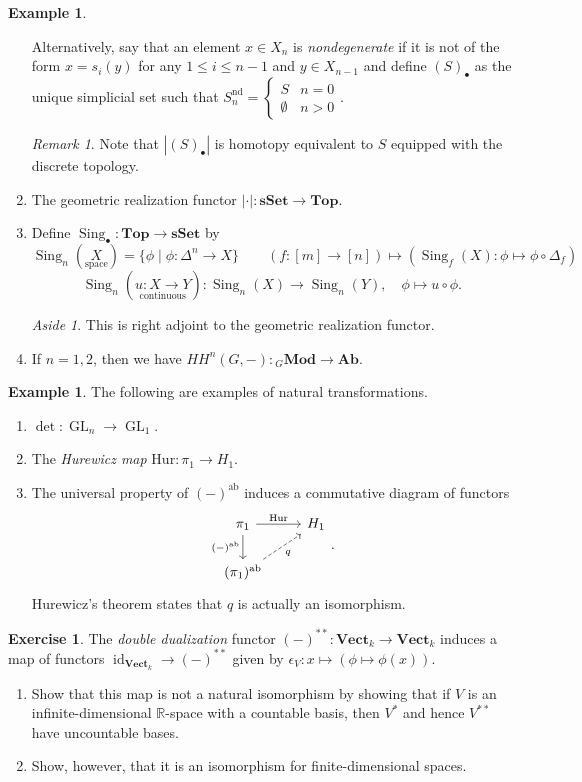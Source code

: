 \documentclass[10pt,letterpaper,cm]{nupset}
\theoremstyle{definition}
\newtheorem{exmp}[definition]{Example}
\theoremstyle{theorem}
\newtheorem{exercise}[definition]{Exercise}
\theoremstyle{remark}
\newtheorem{remark}[definition]{Remark}
\newtheorem*{aside}{Aside}
\newcommand{\R}{\mathbb R}
\newcommand{\1}{\mathbf{1}}
\newcommand{\0}{\vec 0}
\DeclareMathOperator*{\GL}{GL}
\DeclareMathOperator{\id}{id}
\DeclareMathOperator{\ab}{ab}
\DeclareMathOperator{\Sing}{Sing}
\begin{document}
\begin{exmp}
\begin{enumerate}
Alternatively, say that an element  $x\in X_n$ is \textit{nondegenerate} if it is not of the form $x =s_i(y)$ for any $1\leq i \leq n-1$ and $y\in X_{n-1}$ and define $(S)_{\bullet}$ as the unique simplicial set such that $S_n^{\text{nd}} = \begin{cases}
S & n =0 \\ \emptyset & n > 0 \end{cases}.$
\begin{remark}
Note that $|(S)_{\bullet}|$ is homotopy equivalent to $S$ equipped with the discrete topology. 
\end{remark}
\item The geometric realization functor $|\cdot | : \mathbf{sSet} \to \mathbf{Top}$.
\item Define $\Sing_{\bullet} : \mathbf{Top} \to \mathbf{sSet}$ by
$$ \Sing_n(\underset{\text{space}}{X}) = \{\phi \mid \phi  : \Delta^n \to X\} \quad \quad (f: [m] \to [n]) \mapsto (\Sing_f(X) : \phi \mapsto \phi \circ \Delta_f)$$
$$ \Sing_n(\underset{\text{continuous}}{u : X \to Y}) : \Sing_n(X) \to \Sing_n(Y), \quad \phi \mapsto u \circ \phi.$$
\begin{aside} This is right adjoint to the geometric realization functor. \end{aside}
\item If $n=1,2$, then we have $HH^n(G, -) : {}_{G}\mathbf{Mod} \to \mathbf{Ab}$.
\end{enumerate}
\end{exmp}

\begin{exmp} The following are examples of natural transformations.
\begin{enumerate}
\item $\det : \GL_n \to \GL_1$.
\item The \textit{Hurewicz map} $\text{Hur}: \pi_1 \to H_1$. 
\item The universal property of $(-)^{\ab}$ induces a commutative diagram of functors
\[
\begin{tikzcd}
\pi_1 \arrow[r, "\text{Hur}"] \arrow[d, "(-)^{\ab}"'] & H_1 \\
(\pi_1)^{\ab} \arrow[ru, "q"', dashed] & 
\end{tikzcd}
.\] Hurewicz's theorem states that $q$ is actually an isomorphism.
\end{enumerate}
\end{exmp}

\begin{exercise} The \textit{double dualization} functor $(-)^{\ast \ast}: \mathbf{Vect}_k \to \mathbf{Vect}_k$ induces a map of functors $\id_{\mathbf{Vect}_k} \to (-)^{\ast \ast}$ given by $\epsilon_V : x \mapsto (\phi \mapsto \phi(x))$.
\begin{enumerate}
\item Show that this map is not a natural isomorphism by showing that if $V$ is an infinite-dimensional $\R$-space with a countable basis, then $V^{\ast}$ and hence $V^{\ast \ast}$ have uncountable bases.
\item Show, however, that it is an isomorphism for finite-dimensional spaces.
\end{enumerate}
\end{exercise}
\end{document}
